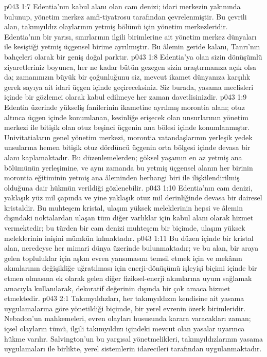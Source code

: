 \vs p043 1:7 Edentia’nın kabul alanı olan cam denizi; idari merkezin yakınında bulunup, yönetim merkez amfi\hyp{}tiyatrosu tarafından çevrelenmiştir. Bu çevrili alan, takımyıldız olaylarının yetmiş bölümü için yönetim merkezleridir. Edentia’nın bir yarısı, sınırlarının ilgili birimlerine ait yönetim merkez dünyaları ile kesiştiği yetmiş üçgensel birime ayrılmıştır. Bu âlemin geride kalanı, Tanrı’nın bahçeleri olarak bir geniş doğal parktır.
\vs p043 1:8 Edentia’ya olan sizin dönüşümlü ziyaretleriniz boyunca, her ne kadar bütün gezegen sizin araştırmanıza açık olsa da; zamanınızın büyük bir çoğunluğunu siz, mevcut ikamet dünyanıza karşılık gerek sayıya ait idari üçgen içinde geçireceksiniz. Siz burada, yasama meclisleri içinde bir gözlemci olarak kabul edilmeye her zaman davetlisinizdir.
\vs p043 1:9 Edentia üzerinde yükseliş fanilerinin ikametine ayrılmış morontia alanı; otuz altınca üçgen içinde konumlanan, kesinliğe erişecek olan unsurlarının yönetim merkezi ile bitişik olan otuz beşinci üçgenin ana bölesi içinde konumlanmıştır. Univitatiaların genel yönetim merkezi, morontia vatandaşlarının yerleşik yedek unsularına hemen bitişik otuz dördüncü üçgenin orta bölgesi içinde devasa bir alanı kaplamaktadır. Bu düzenlemelerden; göksel yaşamın en az yetmiş ana bölümünün yerleşimine, ve aynı zamanda bu yetmiş üçgensel alanın her birinin morontia eğitiminin yetmiş ana âleminden herhangi biri ile ilişkilendirilmiş olduğuna dair hükmün verildiği gözlenebilir.
\vs p043 1:10 Edentia’nın cam denizi, yaklaşık yüz mil çapında ve yine yaklaşık otuz mil derinliğinde devasa bir dairesel kristaldir. Bu muhteşem kristal, ulaşım yüksek meleklerinin hepsi ve âlemin dışındaki noktalardan ulaşan tüm diğer varlıklar için kabul alanı olarak hizmet vermektedir; bu türden bir cam denizi muhteşem bir biçimde, ulaşım yüksek meleklerinin inişini mümkün kılmaktadır.
\vs p043 1:11 Bu düzen içinde bir kristal alan, neredeyse her mimari dünya üzerinde bulunmaktadır; ve bu alan, bir araya gelen topluluklar için aşkın evren yansımasını temsil etmek için ve mekânın akımlarının değişikliğe uğratılması için enerji\hyp{}dönüşümü işleyişi biçimi içinde bir etmen olmasına ek olarak gelen diğer fiziksel\hyp{}enerji akımlarına uyum sağlamak amacıyla kullanılarak, dekoratif değerinin dışında bir çok amaca hizmet etmektedir.
\vs p043 2:1 Takımyıldızları, her takımyıldızın kendisine ait yasama uygulamalarına göre yönetildiği biçimde, bir yerel evrenin özerk birimleridir. Nebadon’un mahkemeleri, evren olayları hususunda karara varacakları zaman; içsel olayların tümü, ilgili takımyıldızı içindeki mevcut olan yasalar uyarınca hükme varılır. Salvington’un bu yargısal yönetmelikleri, takımyıldızlarının yasama uygulamaları ile birlikte, yerel sistemlerin idarecileri tarafından uygulanmaktadır.
